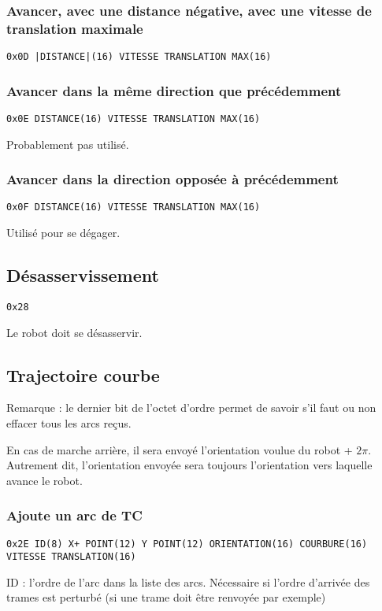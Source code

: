 \documentclass[a4paper, 12pt]{article}
\begin{document}
\subsubsection{Avancer, avec une distance négative, avec une vitesse de translation maximale}

    \texttt{0x0D |DISTANCE|(16) VITESSE  TRANSLATION  MAX(16)}
    
\subsubsection{Avancer dans la même direction que précédemment}

    \texttt{0x0E DISTANCE(16) VITESSE  TRANSLATION  MAX(16)}
    
Probablement pas utilisé.

\subsubsection{Avancer dans la direction opposée à précédemment}

    \texttt{0x0F DISTANCE(16) VITESSE  TRANSLATION  MAX(16)}

Utilisé pour se dégager.

\subsection{Désasservissement}
    \texttt{0x28}

Le robot doit se désasservir.

\subsection{Trajectoire courbe}

Remarque : le dernier bit de l'octet d'ordre permet de savoir s'il faut ou non effacer tous les arcs reçus.

En cas de marche arrière, il sera envoyé l'orientation voulue du robot + $2\pi$. Autrement dit, l'orientation envoyée sera toujours l'orientation vers laquelle avance le robot.

\subsubsection{Ajoute un arc de TC}

\texttt{0x2E ID(8) X+ POINT(12) Y POINT(12) ORIENTATION(16) COURBURE(16) VITESSE  TRANSLATION(16)}
    
ID : l'ordre de l'arc dans la liste des arcs. Nécessaire si l'ordre d'arrivée des trames est perturbé (si une trame doit être renvoyée par exemple)
    
\end{document}
